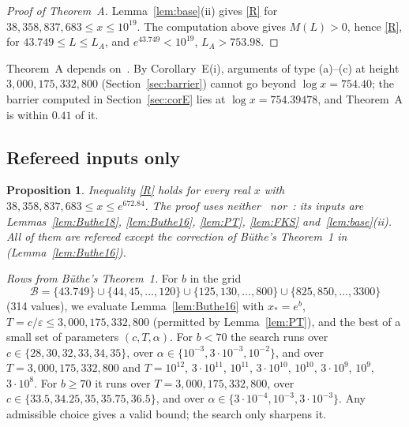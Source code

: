 \documentclass{amsart}
\newtheorem{proposition}[theorem]{Proposition}
\theoremstyle{definition}
\theoremstyle{remark}
\theoremstyle{plain}
\numberwithin{equation}{section}
\newcommand{\eps}{\varepsilon}
\newcommand{\NN}{38{,}358{,}837{,}683}
\newcommand{\HRH}{3{,}000{,}175{,}332{,}800}
\begin{document}
\begin{proof}[Proof of Theorem~A]
Lemma~\ref{lem:base}(ii) gives \eqref{R} for $\NN\le x\le10^{19}$. The computation above gives $M(L)>0$, hence \eqref{R}, for $43.749\le L\le L_A$, and $e^{43.749}<10^{19}$, $L_A>753.98$.
\end{proof}

Theorem~A depends on~\cite[Cor.~1.3]{CH25}. By Corollary~E(i), arguments of type (a)--(c) at height $\HRH$ (Section~\ref{sec:barrier}) cannot go beyond $\log x=754.40$; the barrier computed in Section~\ref{sec:corE} lies at $\log x=754.39478$, and Theorem~A is within $0.41$ of it.

\subsection{Refereed inputs only}\label{sec:Aref}

\begin{proposition}\label{prop:Aref}
Inequality \eqref{R} holds for every real $x$ with $\NN\le x\le e^{672.84}$. The proof uses neither~\cite{CH25} nor~\cite[Table~8]{BKLNW21}: its inputs are Lemmas~\ref{lem:Buthe18}, \ref{lem:Buthe16}, \ref{lem:PT}, \ref{lem:FKS} and~\ref{lem:base}(ii). All of them are refereed except the correction of B\"uthe's Theorem~1 in~\cite{Bha24} (Lemma~\ref{lem:Buthe16}).
\end{proposition}

\emph{Rows from B\"uthe's Theorem~1.} For $b$ in the grid
\[
\mathcal B=\{43.749\}\cup\{44,45,\dots,120\}\cup\{125,130,\dots,800\}\cup\{825,850,\dots,3300\}
\]
(314 values), we evaluate Lemma~\ref{lem:Buthe16} with $x_*=e^b$, $T=c/\eps\le\HRH$ (permitted by Lemma~\ref{lem:PT}), and the best of a small set of parameters $(c,T,\alpha)$. For $b<70$ the search runs over $c\in\{28,30,32,33,34,35\}$, over $\alpha\in\{10^{-3},3\cdot10^{-3},10^{-2}\}$, and over $T=\HRH$ and $T=10^{12}$, $3\cdot10^{11}$, $10^{11}$, $3\cdot10^{10}$, $10^{10}$, $3\cdot10^{9}$, $10^{9}$, $3\cdot10^8$. For $b\ge70$ it runs over $T=\HRH$, over $c\in\{33.5,34.25,35,35.75,36.5\}$, and over $\alpha\in\{3\cdot10^{-4},10^{-3},3\cdot10^{-3}\}$. Any admissible choice gives a valid bound; the search only sharpens it.
\end{document}
